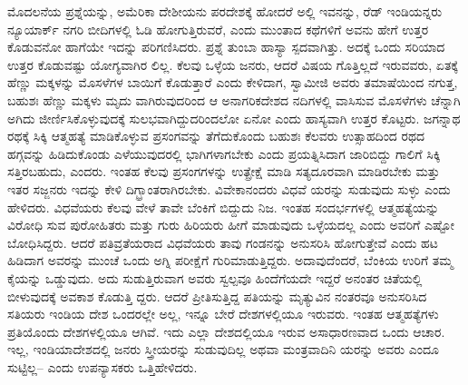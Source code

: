 ಮೊದಲನೆಯ ಪ್ರಶ್ನೆಯನ್ನು, ಅಮೆರಿಕಾ ದೇಶೀಯನು ಪರದೇಶಕ್ಕೆ ಹೋದರೆ ಅಲ್ಲಿ ಇವನನ್ನು, ರೆಡ್​ ಇಂಡಿಯನ್ನರು ನ್ಯೂಯಾರ್ಕ್​ ನಗರಿ ಬೀದಿಗಳಲ್ಲಿ ಓಡಿ ಹೋಗುತ್ತಿರುವರೆ, ಎಂದು ಮುಂತಾದ ಕಥೆಗಳಿಗೆ ಅವನು ಹೇಗೆ ಉತ್ತರ ಕೊಡುವನೋ ಹಾಗೆಯೇ ಇದನ್ನು ಪರಿಗಣಿಸಿದರು. ಪ್ರಶ್ನೆ ತುಂಬಾ ಹಾಸ್ಯಾ ಸ್ಪದವಾಗಿತ್ತು. ಅದಕ್ಕೆ ಒಂದು ಸರಿಯಾದ ಉತ್ತರ ಕೊಡುವಷ್ಟು ಯೋಗ್ಯವಾಗಿರ ಲಿಲ್ಲ. ಕೆಲವು ಒಳ್ಳೆಯ ಜನರು, ಆದರೆ ವಿಷಯ ಗೊತ್ತಿಲ್ಲದೆ ಇರುವವರು, ಏತಕ್ಕೆ ಹೆಣ್ಣು ಮಕ್ಕಳನ್ನು ಮೊಸಳೆಗಳ ಬಾಯಿಗೆ ಕೊಡುತ್ತಾರೆ ಎಂದು ಕೇಳಿದಾಗ, ಸ್ವಾಮೀಜಿ ಅವರು ತಮಾಷೆಯಿಂದ ನಗುತ್ತ, ಬಹುಶಃ ಹೆಣ್ಣು ಮಕ್ಕಳು ಮೃದು ವಾಗಿರುವುದರಿಂದ ಆ ಅನಾಗರಿಕದೇಶದ ನದಿಗಳಲ್ಲಿ ವಾಸಿಸುವ ಮೊಸಳೆಗಳು ಚೆನ್ನಾಗಿ ಅಗಿದು ಜೀರ್ಣಿಸಿಕೊಳ್ಳುವುದಕ್ಕೆ ಸುಲಭವಾಗಿದ್ದುದರಿಂದಲೋ ಏನೋ ಎಂದು ಹಾಸ್ಯವಾಗಿ ಉತ್ತರ ಕೊಟ್ಟರು. ಜಗನ್ನಾಥ ರಥಕ್ಕೆ ಸಿಕ್ಕಿ ಆತ್ಮಹತ್ಯೆ ಮಾಡಿಕೊಳ್ಳುವ ಪ್ರಸಂಗವನ್ನು ತೆಗೆದುಕೊಂದು ಬಹುಶಃ ಕೆಲವರು ಉತ್ಸಾಹದಿಂದ ರಥದ ಹಗ್ಗವನ್ನು ಹಿಡಿದುಕೊಂಡು ಎಳೆಯುವುದರಲ್ಲಿ ಭಾಗಿಗಳಾಗಬೇಕು ಎಂದು ಪ್ರಯತ್ನಿಸಿದಾಗ ಜಾರಿಬಿದ್ದು ಗಾಲಿಗೆ ಸಿಕ್ಕಿ ಸತ್ತಿರಬಹುದು, ಎಂದರು. ಇಂತಹ ಕೆಲವು ಪ್ರಸಂಗಗಳನ್ನು ಉತ್ಪ್ರೇಕ್ಷೆ ಮಾಡಿ ಸತ್ಯದೂರವಾಗಿ ಮಾಡಿರಬೇಕು ಮತ್ತು ಇತರ ಸಜ್ಜನರು ಇದನ್ನು ಕೇಳಿ ದಿಗ್ಭ್ರಾಂತರಾಗಿರಬೇಕು. ವಿವೇಕಾನಂದರು ವಿಧವೆ ಯರನ್ನು ಸುಡುವುದು ಸುಳ್ಳು ಎಂದು ಹೇಳಿದರು. ವಿಧವೆಯರು ಕೆಲವು ವೇಳೆ ತಾವೇ ಬೆಂಕಿಗೆ ಬಿದ್ದುದು ನಿಜ. ಇಂತಹ ಸಂದರ್ಭಗಳಲ್ಲಿ ಆತ್ಮಹತ್ಯೆಯನ್ನು ವಿರೋಧಿ ಸುವ ಪುರೋಹಿತರು ಮತ್ತು ಗುರು ಹಿರಿಯರು ಹೀಗೆ ಮಾಡುವುದು ಒಳ್ಳೆಯದಲ್ಲ ಎಂದು ಅವರಿಗೆ ಎಷ್ಟೋ ಬೋಧಿಸಿದ್ದರು. ಆದರೆ ಪತಿವ್ರತೆಯರಾದ ವಿಧವೆಯರು ತಾವು ಗಂಡನನ್ನು ಅನುಸರಿಸಿ ಹೋಗುತ್ತೇವೆ ಎಂದು ಹಟ ಹಿಡಿದಾಗ ಅವರನ್ನು ಮುಂಚೆ ಒಂದು ಅಗ್ನಿ ಪರೀಕ್ಷೆಗೆ ಗುರಿಮಾಡುತ್ತಿದ್ದರು. ಅದಾವುದೆಂದರೆ, ಬೆಂಕಿಯ ಉರಿಗೆ ತಮ್ಮ ಕೈಯನ್ನು ಒಡ್ಡುವುದು. ಅದು ಸುಡುತ್ತಿರುವಾಗ ಅವರು ಸ್ವಲ್ಪವೂ ಹಿಂದೆಗೆಯದೇ ಇದ್ದರೆ ಅನಂತರ ಚಿತೆಯಲ್ಲಿ ಬೀಳುವುದಕ್ಕೆ ಅವಕಾಶ ಕೊಡುತ್ತಿ ದ್ದರು. ಆದರೆ ಪ್ರೀತಿಸುತ್ತಿದ್ದ ಪತಿಯನ್ನು ಮೃತ್ಯುವಿನ ನಂತರವೂ ಅನುಸರಿಸಿದ ಸತಿಯರು ಇಂಡಿಯ ದೇಶ ಒಂದರಲ್ಲೇ ಅಲ್ಲ, ಇನ್ನೂ ಬೇರೆ ದೇಶಗಳಲ್ಲಿಯೂ ಇರುವರು. ಇಂತಹ ಆತ್ಮಹತ್ಯೆಗಳು ಪ್ರತಿಯೊಂದು ದೇಶಗಳಲ್ಲಿಯೂ ಆಗಿವೆ. ಇದು ಎಲ್ಲಾ ದೇಶದಲ್ಲಿಯೂ ಇರುವ ಅಸಾಧಾರಣವಾದ ಒಂದು ಆಚಾರ. ಇಲ್ಲ, ಇಂಡಿಯಾದೇಶದಲ್ಲಿ ಜನರು ಸ್ತ್ರೀಯರನ್ನು ಸುಡುವುದಿಲ್ಲ ಅಥವಾ ಮಂತ್ರವಾದಿನಿ ಯರನ್ನು ಅವರು ಎಂದೂ ಸುಟ್ಟಿಲ್ಲ– ಎಂದು ಉಪನ್ಯಾಸಕರು ಒತ್ತಿಹೇಳಿದರು.


